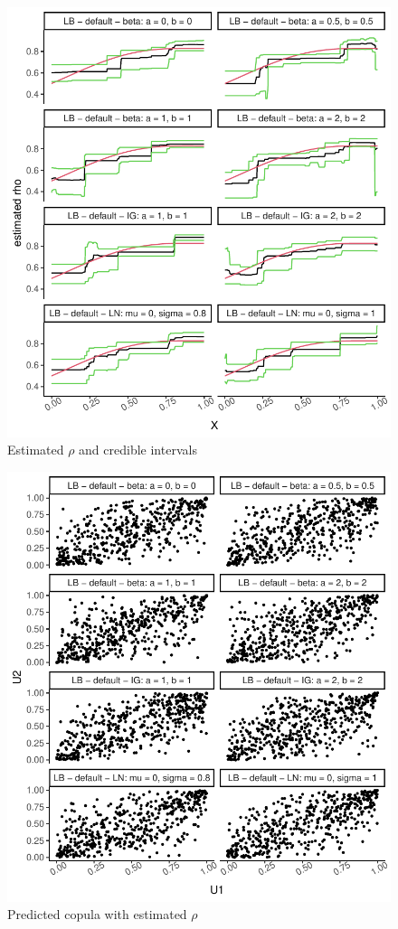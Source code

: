 \documentclass{amsart}
\begin{document}
\begin{figure}[ht]
	\centering
	\includegraphics[width=0.95\linewidth]{predicted_rho_2.pdf}
	\caption{Estimated $\rho$ and credible intervals}
	\label{fig:pred:rho:2}
\end{figure}

\begin{figure}[ht]
	\centering
	\includegraphics[width=0.95\linewidth]{simulated_copula_2.pdf}
	\caption{Predicted copula with estimated $\rho$}
	\label{fig:sim:copula:2}
\end{figure}
\end{document}
